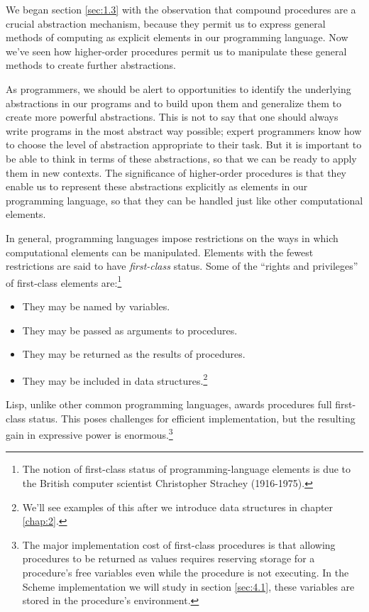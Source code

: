 We began section \ref{sec:1.3} with the observation that compound
procedures are a crucial abstraction mechanism, because they permit us
to express general methods of computing as explicit elements in our
programming language.  Now we've seen how higher-order procedures
permit us to manipulate these general methods to create further
abstractions.

As programmers, we should be alert to opportunities to identify the
underlying abstractions in our programs and to build upon them and
generalize them to create more powerful abstractions.  This is not to
say that one should always write programs in the most abstract way
possible; expert programmers know how to choose the level of
abstraction appropriate to their task.  But it is important to be able
to think in terms of these abstractions, so that we can be ready to
apply them in new contexts.  The significance of higher-order
procedures is that they enable us to represent these abstractions
explicitly as elements in our programming language, so that they can
be handled just like other computational elements.

In general, programming languages impose restrictions on the ways in
which computational elements can be manipulated.  Elements with the
fewest restrictions are said to have \textit{first-class} status.
Some of the ``rights and privileges'' of first-class elements
are:\footnote{The notion of first-class status of programming-language
  elements is due to the British computer scientist Christopher
  Strachey (1916-1975).}
\begin{itemize}
\item They may be named by variables.
\item They may be passed as arguments to procedures.
\item They may be returned as the results of procedures.
\item They may be included in data structures.\footnote{We'll see
examples of this after we introduce data structures in chapter \ref{chap:2}.}
\end{itemize}
Lisp, unlike other common programming languages, awards procedures
full first-class status.  This poses challenges for efficient
implementation, but the resulting gain in expressive power is
enormous.\footnote{The major implementation cost of first-class
  procedures is that allowing procedures to be returned as values
  requires reserving storage for a procedure's free variables even
  while the procedure is not executing.  In the Scheme implementation
  we will study in section \ref{sec:4.1}, these variables are stored
  in the procedure's environment.}

